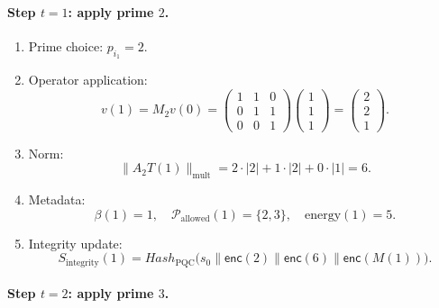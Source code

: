 \documentclass[11pt]{article}
\begin{document}
\paragraph{Step \(t=1\): apply prime \(2\).}

\begin{enumerate}[leftmargin=1.5em]
  \item Prime choice: \(p_{i_1} = 2\).
  \item Operator application:
  \[
    v(1) = M_2 v(0) =
    \begin{pmatrix}
    1 & 1 & 0 \\
    0 & 1 & 1 \\
    0 & 0 & 1
    \end{pmatrix}
    \begin{pmatrix}1\\1\\1\end{pmatrix}
    = \begin{pmatrix}2\\2\\1\end{pmatrix}.
  \]
  \item Norm:
  \[
    \|A_{2}T(1)\|_{\text{mult}} =
    2\cdot|2| + 1\cdot|2| + 0\cdot|1| = 6.
  \]
  \item Metadata:
  \[
    \beta(1) = 1, \quad
    \mathcal{P}_{\text{allowed}}(1) = \{2,3\}, \quad
    \text{energy}(1) = 5.
  \]
  \item Integrity update:
  \[
    S_{\text{integrity}}(1)
    = Hash_{\text{PQC}}\big(
      s_0 \parallel \mathsf{enc}(2)\parallel \mathsf{enc}(6)\parallel \mathsf{enc}(M(1))
    \big).
  \]
\end{enumerate}

\paragraph{Step \(t=2\): apply prime \(3\).}
\end{document}
